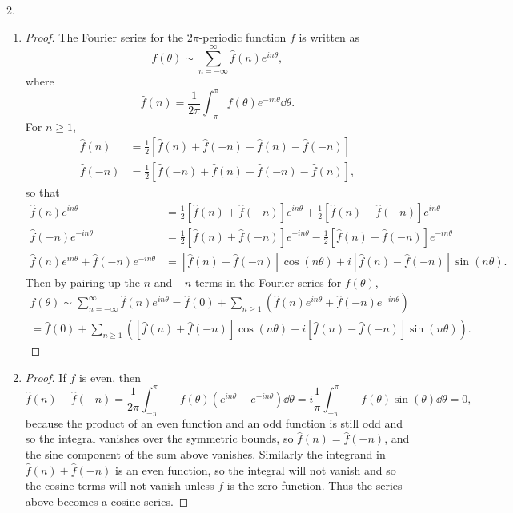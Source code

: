 \documentclass[11pt]{article}
\newcommand{\br}[1]{\left(#1\right)}
\newcommand{\sbr}[1]{\left[#1\right]}
\begin{document}
2. \begin{enumerate}[label=(\alph*)]
    \item \begin{proof}
        The Fourier series for the $2\pi$-periodic function $f$ is written as \[f(\theta)\sim\sum_{n=-\infty}^{\infty}\hat{f}(n)e^{in\theta},\] where \[\hat{f}(n) = \frac{1}{2\pi}\int_{-\pi}^{\pi}f(\theta)e^{-in\theta}\dd{\theta}.\] For $n\geq 1$, \begin{align*}
            \hat{f}(n) &= \frac{1}{2}\sbr{\hat{f}(n)+\hat{f}(-n) + \hat{f}(n)-\hat{f}(-n)} \\
            \hat{f}(-n) &= \frac{1}{2}\sbr{\hat{f}(-n)+\hat{f}(n) + \hat{f}(-n)-\hat{f}(n)},
        \end{align*} so that \begin{align*}
            \hat{f}(n)e^{in\theta} &= \frac{1}{2}\sbr{\hat{f}(n)+\hat{f}(-n)}e^{in\theta} + \frac{1}{2}\sbr{\hat{f}(n)-\hat{f}(-n)}e^{in\theta} \\
            \hat{f}(-n)e^{-in\theta} &= \frac{1}{2}\sbr{\hat{f}(n)+\hat{f}(-n)}e^{-in\theta} - \frac{1}{2}\sbr{\hat{f}(n)-\hat{f}(-n)}e^{-in\theta} \\
            \hat{f}(n)e^{in\theta} + \hat{f}(-n)e^{-in\theta} &= \sbr{\hat{f}(n)+\hat{f}(-n)}\cos(n\theta) + i\sbr{\hat{f}(n)-\hat{f}(-n)}\sin(n\theta).
        \end{align*} Then by pairing up the $n$ and $-n$ terms in the Fourier series for $f(\theta)$, \begin{multline*} f(\theta)\sim\sum_{n=-\infty}^{\infty}\hat{f}(n)e^{in\theta} = \hat{f}(0) + \sum_{n\geq 1}\br{\hat{f}(n)e^{in\theta} + \hat{f}(-n)e^{-in\theta}}\\ = \hat{f}(0) + \sum_{n\geq 1}\br{\sbr{\hat{f}(n)+\hat{f}(-n)}\cos(n\theta) + i\sbr{\hat{f}(n)-\hat{f}(-n)}\sin(n\theta)}.\end{multline*}
    \end{proof}
    \item \begin{proof}
        If $f$ is even, then \[\hat{f}(n)-\hat{f}(-n) = \frac{1}{2\pi}\int_{-\pi}^{\pi}-f(\theta)\br{e^{in\theta}-e^{-in\theta}}\dd{\theta} = i\frac{1}{\pi}\int_{-\pi}^{\pi}-f(\theta)\sin(\theta)\dd{\theta} = 0,\] because the product of an even function and an odd function is still odd and so the integral vanishes over the symmetric bounds, so $\hat{f}(n)=\hat{f}(-n)$, and the sine component of the sum above vanishes. Similarly the integrand in $\hat{f}(n)+\hat{f}(-n)$ is an even function, so the integral will not vanish and so the cosine terms will not vanish unless $f$ is the zero function. Thus the series above becomes a cosine series.

\end{proof}
\end{enumerate}
\end{document}
